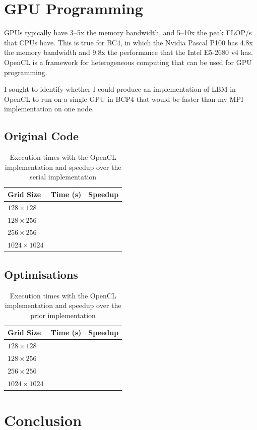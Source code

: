 \documentclass[twocolumn, a4paper]{article}
\begin{document}
\section{GPU Programming}

GPUs typically have 3--5x the memory bandwidth, and 5--10x the peak FLOP/s that CPUs have.
This is true for BC4, in which the Nvidia Pascal P100 has 4.8x the memory bandwidth and 9.8x the performance that the Intel E5-2680 v4 has.
OpenCL is a framework for heterogeneous computing that can be used for GPU programming.

I sought to identify whether I could produce an implementation of LBM in OpenCL to run on a single GPU in BCP4 that would be faster than my MPI implementation on one node.

\subsection{Original Code}

\begin{table}[htbp]
  \begin{center}
  \caption{Execution times with the OpenCL implementation and speedup over the serial implementation}\label{tab:OpenCL_1}
  \begin{tabular}[t]{l | l l} 
      \hline\hline
      Grid Size&Time (s)&Speedup\\
      \hline
      $128 \times 128$&\texttt{}&\texttt{}\\
      $128 \times 256$&\texttt{}&\texttt{}\\
      $256 \times 256$&\texttt{}&\texttt{}\\
      $1024 \times 1024$&\texttt{}&\texttt{}\\
      \hline
    \end{tabular}
  \end{center}
\end{table}

\subsection{Optimisations}

\begin{table}[htbp]
  \begin{center}
  \caption{Execution times with the OpenCL implementation and speedup over the prior implementation}\label{tab:OpenCL_2}
  \begin{tabular}[t]{l | l l} 
      \hline\hline
      Grid Size&Time (s)&Speedup\\
      \hline
      $128 \times 128$&\texttt{}&\texttt{}\\
      $128 \times 256$&\texttt{}&\texttt{}\\
      $256 \times 256$&\texttt{}&\texttt{}\\
      $1024 \times 1024$&\texttt{}&\texttt{}\\
      \hline
    \end{tabular}
  \end{center}
\end{table}

\section{Conclusion}

\printbibliography
\end{document}
